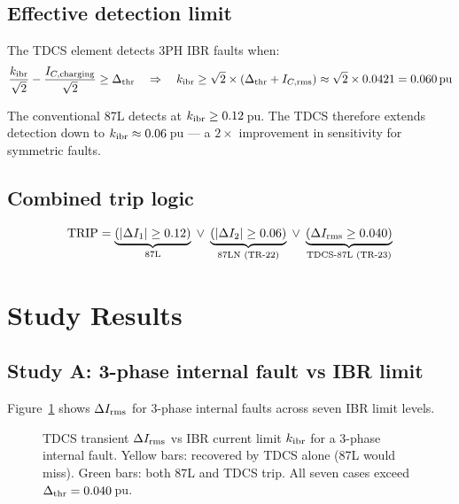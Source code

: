 \documentclass[11pt, a4paper]{article}
\begin{document}
\subsection{Effective detection limit}

The TDCS element detects 3PH IBR faults when:
\begin{equation}
  \frac{k_{\rm ibr}}{\sqrt{2}} - \frac{I_{C,\rm charging}}{\sqrt{2}}
  \geq \Delta_{\rm thr}
  \quad\Rightarrow\quad
  k_{\rm ibr} \geq \sqrt{2} \times (\Delta_{\rm thr} + I_{C,\rm rms})
            \approx \sqrt{2} \times 0.0421 = 0.060\,\text{pu}
\end{equation}

The conventional 87L detects at $k_{\rm ibr} \geq 0.12$\,pu.  The TDCS
therefore extends detection down to $k_{\rm ibr} \approx 0.06$\,pu — a
$2\times$ improvement in sensitivity for symmetric faults.

\subsection{Combined trip logic}

\begin{equation}
  \text{TRIP} = \underbrace{(|\Delta I_1| \geq 0.12)}_{\text{87L}}
              \;\vee\;
              \underbrace{(|\Delta I_2| \geq 0.06)}_{\text{87LN (TR-22)}}
              \;\vee\;
              \underbrace{(\Delta I_{\rm rms} \geq 0.040)}_{\text{TDCS-87L (TR-23)}}
  \label{eq:combined}
\end{equation}


\section{Study Results}
\label{sec:results}

\subsection{Study A: 3-phase internal fault vs IBR limit}

Figure~\ref{fig:delta_I} shows $\Delta I_{\rm rms}$ for 3-phase internal
faults across seven IBR limit levels.

\begin{figure}[h]
  \centering
  
  \caption{TDCS transient $\Delta I_{\rm rms}$ vs IBR current limit $k_{\rm ibr}$
           for a 3-phase internal fault.  Yellow bars: recovered by TDCS alone
           (87L would miss).  Green bars: both 87L and TDCS trip.
           All seven cases exceed $\Delta_{\rm thr}=0.040$\,pu.}
  \label{fig:delta_I}
\end{figure}
\end{document}

